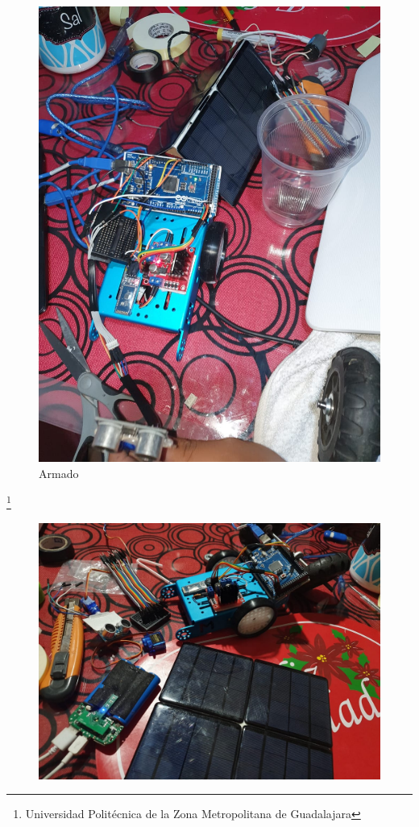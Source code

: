 \documentclass[11pt,a4paper]{article}
\begin{document}
\begin{figure}[hbtp]
\centering
\includegraphics[scale=0.15]{Pictures/Arduino.jpeg}
\caption{Armado }
\end{figure}
\footnote{Universidad Politécnica de la Zona Metropolitana de Guadalajara}

\newpage
\begin{figure}[hbtp]
\centering
\includegraphics[scale=0.2]{Pictures/Armado.jpeg}
\caption{}
\end{figure}
\end{document}
